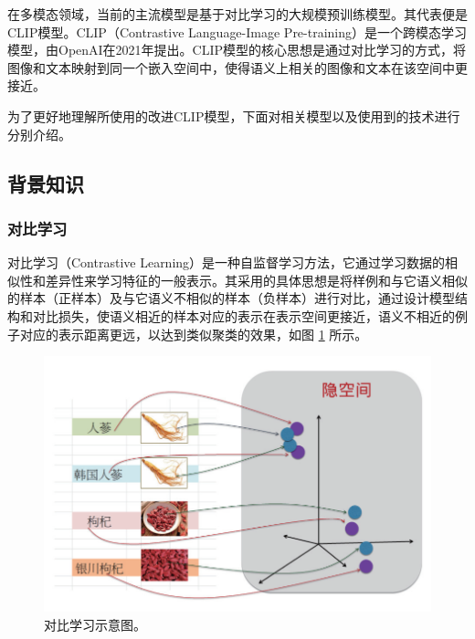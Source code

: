 \documentclass[a4paper]{zreport}
\begin{document}
在多模态领域，当前的主流模型是基于对比学习的大规模预训练模型。其代表便是CLIP模型。CLIP（Contrastive Language-Image Pre-training）是一个跨模态学习模型\cite{clip}，由OpenAI在2021年提出。CLIP模型的核心思想是通过对比学习的方式，将图像和文本映射到同一个嵌入空间中，使得语义上相关的图像和文本在该空间中更接近。

为了更好地理解所使用的改进CLIP模型，下面对相关模型以及使用到的技术进行分别介绍。

\subsection{背景知识}

\subsubsection{对比学习}

对比学习（Contrastive Learning）是一种自监督学习方法\cite{liu2021self}，它通过学习数据的相似性和差异性来学习特征的一般表示。其采用的具体思想是将样例和与它语义相似的样本（正样本）及与它语义不相似的样本（负样本）进行对比，通过设计模型结构和对比损失，使语义相近的样本对应的表示在表示空间更接近，语义不相近的例子对应的表示距离更远，以达到类似聚类的效果，如图 \ref{fig:cl1} 所示。

\begin{figure}[h]
\centering
\includegraphics[width=0.75\linewidth]{figures/cl1}
\caption{对比学习示意图。}
\label{fig:cl1}
\end{figure}
\end{document}
